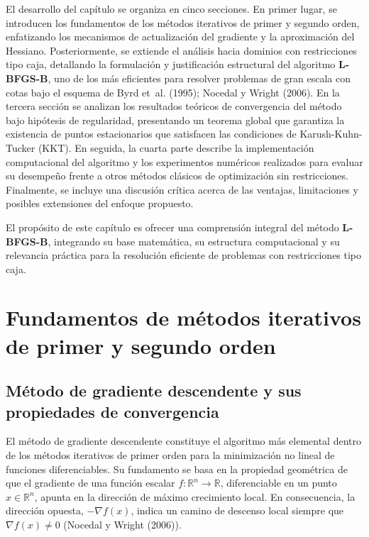 \documentclass[
  spanish,
  us-letterpaper,
  DIV=11,
  numbers=noendperiod]{scrreprt}
\numberwithin{equation}{section}
\begin{document}
El desarrollo del capítulo se organiza en cinco secciones. En primer
lugar, se introducen los fundamentos de los métodos iterativos de primer
y segundo orden, enfatizando los mecanismos de actualización del
gradiente y la aproximación del Hessiano. Posteriormente, se extiende el
análisis hacia dominios con restricciones tipo caja, detallando la
formulación y justificación estructural del algoritmo \textbf{L-BFGS-B},
uno de los más eficientes para resolver problemas de gran escala con
cotas bajo el esquema de Byrd et~al. (1995); Nocedal y Wright (2006). En
la tercera sección se analizan los resultados teóricos de convergencia
del método bajo hipótesis de regularidad, presentando un teorema global
que garantiza la existencia de puntos estacionarios que satisfacen las
condiciones de Karush-Kuhn-Tucker (KKT). En seguida, la cuarta parte
describe la implementación computacional del algoritmo y los
experimentos numéricos realizados para evaluar su desempeño frente a
otros métodos clásicos de optimización sin restricciones. Finalmente, se
incluye una discusión crítica acerca de las ventajas, limitaciones y
posibles extensiones del enfoque propuesto.

El propósito de este capítulo es ofrecer una comprensión integral del
método \textbf{L-BFGS-B}, integrando su base matemática, su estructura
computacional y su relevancia práctica para la resolución eficiente de
problemas con restricciones tipo caja.

\section{Fundamentos de métodos iterativos de primer y segundo
orden}\label{fundamentos-de-muxe9todos-iterativos-de-primer-y-segundo-orden}

\subsection{Método de gradiente descendente y sus propiedades de
convergencia}\label{muxe9todo-de-gradiente-descendente-y-sus-propiedades-de-convergencia}

El método de gradiente descendente constituye el algoritmo más elemental
dentro de los métodos iterativos de primer orden para la minimización no
lineal de funciones diferenciables. Su fundamento se basa en la
propiedad geométrica de que el gradiente de una función escalar
\(f: \mathbb{R}^n \to \mathbb{R}\), diferenciable en un punto
\(x \in \mathbb{R}^n\), apunta en la dirección de máximo crecimiento
local. En consecuencia, la dirección opuesta, \(-\nabla f(x)\), indica
un camino de descenso local siempre que \(\nabla f(x) \neq 0\) (Nocedal
y Wright (2006)).
\end{document}
